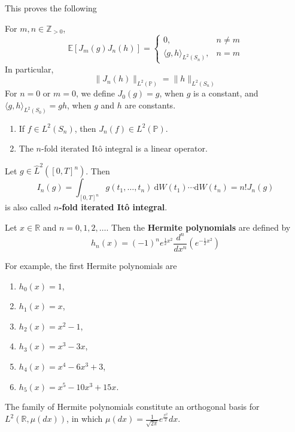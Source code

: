 This proves the following

\begin{proposition}
    For \(m, n \in \mathbb{Z}_{>0}\), \[
    \mathbb{E}[J_m(g) J_n(h)] = 
    \begin{cases}
        0, & n \neq m \\
        \langle g, h \rangle_{L^2(S_n)}, & n = m
    \end{cases}
    \] In particular, \[
    \| J_n(h) \|_{L^2(\mathbb{P})} = \| h \|_{L^2(S_n)}
    \] For \(n = 0\) or \(m = 0\), we define \(J_0(g) = g\), when \(g\) is a
    constant, and \(\langle g, h \rangle_{L^2(S_0)} = gh\), when \(g\) and
    \(h\) are constants.
\end{proposition}

\begin{remark}
    \begin{enumerate}
        \def\labelenumi{\arabic{enumi}.}
        \item
          If \(f \in L^2(S_n)\), then \(J_n(f) \in L^2(\mathbb{P})\).
        \item
          The \(n\)-fold iterated Itô integral is a linear operator.
        \end{enumerate}
\end{remark}

\begin{definition}
    Let \(g \in \hat{L}^2([0,T]^n)\). Then \[
    I_n(g) = \int_{[0,T]^n} g(t_1, \ldots, t_n) ~\mathrm{d}W(t_1) \cdots \mathrm{d}W(t_n) = n! J_n(g)
\] is also called \textbf{\(n\)-fold iterated Itô integral}.
\end{definition}

Let $x \in \mathbb{R}$ and $n = 0, 1, 2, \ldots$. Then the \textbf{Hermite polynomials} are defined by
$$
h_n(x) = (-1)^n e^{\frac{1}{2} x^2} \frac{d^n}{dx^n} \left( e^{-\frac{1}{2} x^2} \right)
$$

For example, the first Hermite polynomials are 
\begin{enumerate}
\item $h_0(x) = 1$,
\item $h_1(x) = x$,
\item $h_2(x) = x^2 - 1$,
\item $h_3(x) = x^3 - 3x$, 
\item $h_4(x) = x^4 - 6x^3 + 3$,
\item $h_5(x) = x^5 - 10x^3 + 15x$.
\end{enumerate}

The family of Hermite polynomials constitute an orthogonal basis for $L^2(\mathbb{R}, \mu(dx))$, in which $\mu(dx) = \frac{1}{\sqrt{2 \pi}} e^{\frac{x^2}{2}} dx$.

